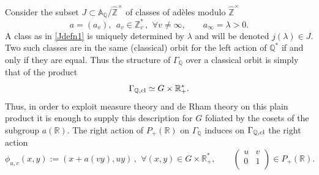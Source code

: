\documentclass[graybox, envcountsect%
]{svmult}
\def\A{{\mathbb A}}
\def\Q{{\mathbb Q}}
\def\R{{\mathbb R}}
\def\Z{{\mathbb Z}}
\def\hatz{{\hat\Z^\times}}
\def\qqq{\,,\,~\forall}
\def\gaq{{\Gamma_\Q}}
\begin{document}
Consider the  subset $J\subset \A_\Q/\hatz$ of classes of ad\`eles modulo $\hatz$
\begin{equation}\label{Jdefn1}
	a=(a_v), \ \ a_v\in \Z_v^*\qqq v\neq\infty, \qquad  a_\infty=\lambda >0.
\end{equation}
A class as in \eqref{Jdefn1} is uniquely determined by $\lambda$  and will be denoted $j(\lambda)\in J$. Two such classes are in the same (classical) orbit for the left action of $\Q^*$ if and only if they are equal. Thus the structure of $\gaq$ over a classical orbit is simply that of the product 
$$
\Gamma_{\Q,{\rm cl}}\simeq G\times \R_+^*.
$$
Thus, in order to exploit measure theory and   de Rham theory on this plain product it is enough to supply this description for $G$ foliated by the cosets of the subgroup $a(\R)$. 
The  right action of  $P_+(\R)$ on $\gaq$  
induces on $\Gamma_{\Q,{\rm cl}}$ the right  action 
$$
\phi_{u,v}(x,y):=(x+a(vy),uy)\qqq (x,y)\in G\times \R_+^*, \qquad \left(
\begin{array}{cc}
 u & v \\
 0 & 1 \\
\end{array}
\right)\in P_+(\R).
$$
\end{document}
